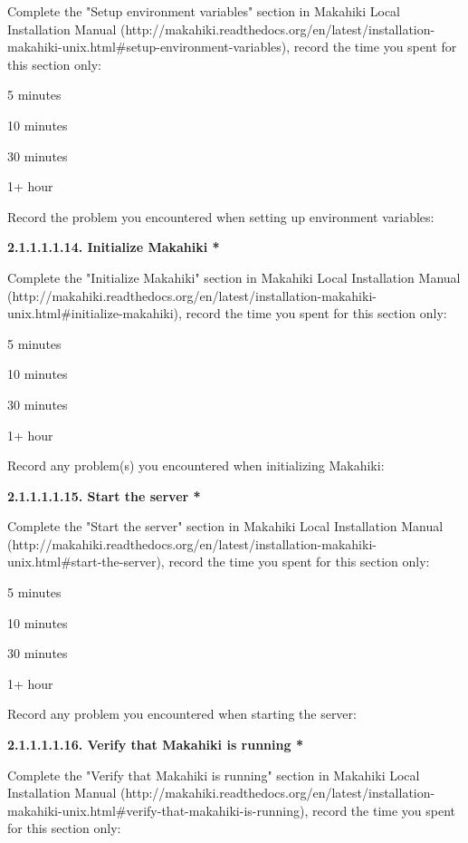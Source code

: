 Complete the "Setup environment variables" section in Makahiki Local Installation Manual (http://makahiki.readthedocs.org/en/latest/installation-makahiki-unix.html\#setup-environment-variables), record the time you spent for this section only:

\begin{compactitem}
\item 5 minutes
\item  10 minutes
\item  30 minutes
\item  1+ hour
\end{compactitem}

Record the problem you encountered when setting up environment variables:

{\bf 2.1.1.1.1.14. Initialize Makahiki *}

Complete the "Initialize Makahiki" section in Makahiki Local Installation Manual (http://makahiki.readthedocs.org/en/latest/installation-makahiki-unix.html\#initialize-makahiki), record the time you spent for this section only:

\begin{compactitem}
\item 5 minutes
\item  10 minutes
\item  30 minutes
\item  1+ hour
\end{compactitem}

Record any problem(s) you encountered when initializing Makahiki:

{\bf 2.1.1.1.1.15. Start the server *}

Complete the "Start the server" section in Makahiki Local Installation Manual (http://makahiki.readthedocs.org/en/latest/installation-makahiki-unix.html\#start-the-server), record the time you spent for this section only:

\begin{compactitem}
\item 5 minutes
\item  10 minutes
\item  30 minutes
\item  1+ hour
\end{compactitem}

Record any problem you encountered when starting the server:

{\bf 2.1.1.1.1.16. Verify that Makahiki is running *}

Complete the "Verify that Makahiki is running" section in Makahiki Local Installation Manual (http://makahiki.readthedocs.org/en/latest/installation-makahiki-unix.html\#verify-that-makahiki-is-running), record the time you spent for this section only:

